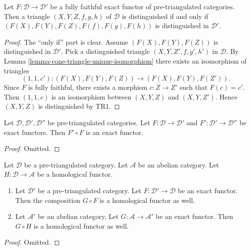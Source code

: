 \begin{lemma}
\label{lemma-exact-equivalence}
Let $F : \mathcal{D} \to \mathcal{D}'$ be a fully faithful exact functor
of pre-triangulated categories. Then a triangle $(X, Y, Z, f, g, h)$
of $\mathcal{D}$ is distinguished if and only if
$(F(X), F(Y), F(Z), F(f), F(g), F(h))$ is distinguished in $\mathcal{D}'$.
\end{lemma}

\begin{proof}
The ``only if'' part is clear. Assume $(F(X), F(Y), F(Z))$ is
distinguished in $\mathcal{D}'$. Pick a distinguished triangle
$(X, Y, Z', f, g', h')$ in $\mathcal{D}$. By
Lemma \ref{lemma-cone-triangle-unique-isomorphism}
there exists an isomorphism of triangles
$$
(1, 1, c') : (F(X), F(Y), F(Z)) \longrightarrow (F(X), F(Y), F(Z')).
$$
Since $F$ is fully faithful, there exists a morphism $c : Z \to Z'$
such that $F(c) = c'$. Then $(1, 1, c)$ is an isomorphism between
$(X, Y, Z)$ and $(X, Y, Z')$. Hence $(X, Y, Z)$ is distinguished
by TR1.
\end{proof}

\begin{lemma}
\label{lemma-composition-exact}
Let $\mathcal{D}, \mathcal{D}', \mathcal{D}''$ be pre-triangulated categories.
Let $F : \mathcal{D} \to \mathcal{D}'$ and
$F' : \mathcal{D}' \to \mathcal{D}''$ be exact functors.
Then $F' \circ F$ is an exact functor.
\end{lemma}

\begin{proof}
Omitted.
\end{proof}

\begin{lemma}
\label{lemma-exact-compose-homological-functor}
Let $\mathcal{D}$ be a pre-triangulated category.
Let $\mathcal{A}$ be an abelian category.
Let $H : \mathcal{D} \to \mathcal{A}$ be a homological functor.
\begin{enumerate}
\item Let $\mathcal{D}'$ be a pre-triangulated category.
Let $F : \mathcal{D}' \to \mathcal{D}$ be an exact functor.
Then the composition $G \circ F$ is a homological functor as well.
\item Let $\mathcal{A}'$ be an abelian category. Let
$G : \mathcal{A} \to \mathcal{A}'$ be an exact functor.
Then $G \circ H$ is a homological functor as well.
\end{enumerate}
\end{lemma}

\begin{proof}
Omitted.
\end{proof}

